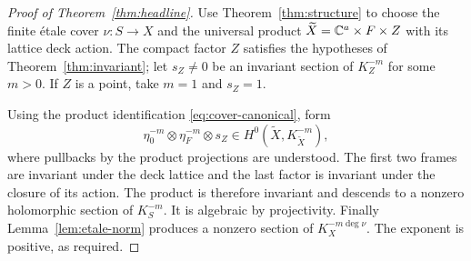 \begin{proof}[Proof of Theorem~\ref{thm:headline}]
Use Theorem~\ref{thm:structure} to choose the finite \'etale cover
$\nu:S\to X$ and the universal product
$\widetilde X=\mathbb C^a\times F\times Z$ with its lattice deck action.
The compact factor $Z$ satisfies the hypotheses of
Theorem~\ref{thm:invariant}; let $s_Z\ne0$ be an invariant section
of $K_Z^{-m}$ for some $m>0$. If $Z$ is a point, take $m=1$ and
$s_Z=1$.

Using the product identification \eqref{eq:cover-canonical}, form
\[
     \eta_0^{-m}\otimes\eta_F^{-m}\otimes s_Z
                \in H^0(\widetilde X,K_{\widetilde X}^{-m}),
\]
where pullbacks by the product projections are understood. The first
two frames are invariant under the deck lattice and the last factor
is invariant under the closure of its action. The product is therefore
invariant and descends to a nonzero holomorphic section of $K_S^{-m}$.
It is algebraic by projectivity. Finally Lemma~\ref{lem:etale-norm}
produces a nonzero section of $K_X^{-m\deg\nu}$. The exponent is
positive, as required.
\end{proof}

